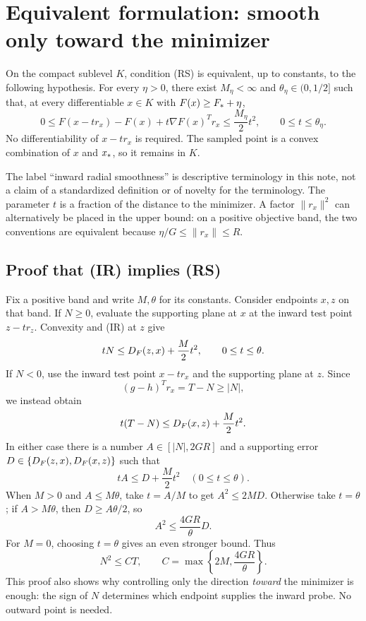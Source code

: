 \setcounter{section}{1}
\setcounter{theorem}{0}
\setcounter{equation}{1}
\section{Equivalent formulation: smooth only toward the minimizer}
\begin{theorem}\label{R:thm:equiv}
On the compact sublevel $K$, condition (RS) is equivalent, up to constants, to the following hypothesis. For every $\eta>0$, there exist $M_\eta<\infty$ and $\theta_\eta\in(0,1/2]$ such that, at every differentiable $x\in K$ with $F(x)\ge F_*+\eta$,
\begin{equation}
 0\le F(x-t r_x)-F(x)+t\nabla F(x)^Tr_x
 \le \frac{M_\eta}{2}t^2,
 \qquad 0\le t\le\theta_\eta.
 \tag{R.IR}\label{R:eq:IR}
\end{equation}
No differentiability of $x-t r_x$ is required. The sampled point is a convex combination of $x$ and $x_*$, so it remains in $K$.
\end{theorem}
The label ``inward radial smoothness'' is descriptive terminology in this note, not a claim of a standardized definition or of novelty for the terminology. The parameter $t$ is a fraction of the distance to the minimizer. A factor $\|r_x\|^2$ can alternatively be placed in the upper bound: on a positive objective band, the two conventions are equivalent because $\eta/G\le\|r_x\|\le R$.

\subsection{Proof that (IR) implies (RS)}
Fix a positive band and write $M,\theta$ for its constants. Consider endpoints $x,z$ on that band. If $N\ge0$, evaluate the supporting plane at $x$ at the inward test point $z-t r_z$. Convexity and (IR) at $z$ give
\[
 tN\le D_F(z,x)+\frac M2t^2,\qquad 0\le t\le\theta.
\]
If $N<0$, use the inward test point $x-t r_x$ and the supporting plane at $z$. Since
\[
 (g-h)^Tr_x=T-N\ge|N|,
\]
we instead obtain
\[
 t(T-N)\le D_F(x,z)+\frac M2t^2.
\]
In either case there is a number $A\in[|N|,2GR]$ and a supporting error $D\in\{D_F(z,x),D_F(x,z)\}$ such that
\[
 tA\le D+\frac M2t^2\quad(0\le t\le\theta).
\]
When $M>0$ and $A\le M\theta$, take $t=A/M$ to get $A^2\le2MD$. Otherwise take $t=\theta$; if $A>M\theta$, then $D\ge A\theta/2$, so
\[
 A^2\le \frac{4GR}{\theta}D.
\]
For $M=0$, choosing $t=\theta$ gives an even stronger bound. Thus
\begin{equation}
 N^2\le C T,\qquad
 C=\max\left\{2M,\frac{4GR}{\theta}\right\}.
 \label{R:eq:IRtoRS}
\end{equation}
This proof also shows why controlling only the direction \emph{toward} the minimizer is enough: the sign of $N$ determines which endpoint supplies the inward probe. No outward point is needed.

